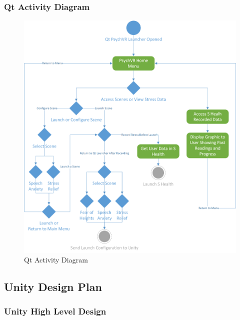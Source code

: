 \documentclass[a4paper,10pt]{article}
\begin{document}
		\subsubsection{Qt Activity Diagram}
				\begin{figure}[H]
					\includegraphics[width=\linewidth,height=\paperheight,keepaspectratio]{qtActivityDiag.png}
					\caption{Qt Activity Diagram} 
					
					\label{fig:qtactivity}
				\end{figure}
				\pagebreak
	\subsection{Unity Design Plan}
		\subsubsection{Unity High Level Design}
		\pagebreak
\end{document}
